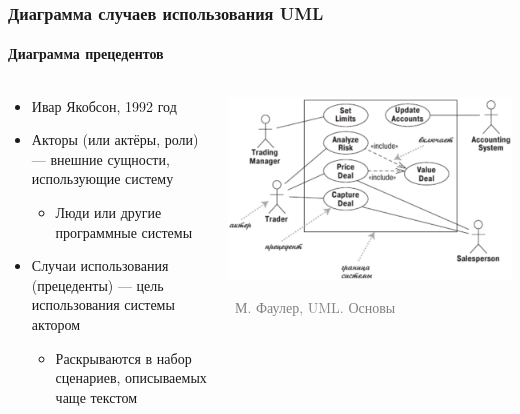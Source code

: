 \documentclass[xetex,mathserif,serif]{beamer}
\newcommand{\attribution}[1] {
    \vspace{-5mm}\begin{flushright}\begin{scriptsize}\textcolor{gray}{\textcopyright\, #1}\end{scriptsize}\end{flushright}
}
\begin{document}
    \begin{frame}
        \frametitle{Диаграмма случаев использования UML}
        \framesubtitle{Диаграмма прецедентов}
        \begin{columns}
            \begin{column}{0.5\textwidth}
                \begin{itemize}
                    \item Ивар Якобсон, 1992 год
                    \item Акторы (или актёры, роли) --- внешние сущности, использующие систему
                    \begin{itemize}
                        \item Люди или другие программные системы
                    \end{itemize}
                    \item Случаи использования (прецеденты)  --- цель использования системы актором
                    \begin{itemize}
                        \item Раскрываются в набор сценариев, описываемых чаще текстом
                    \end{itemize}
                \end{itemize}
            \end{column}
            \begin{column}{0.5\textwidth}
                \begin{center}
                    \includegraphics[width=\textwidth]{useCaseDiagram.png}
                    \attribution{М. Фаулер, UML. Основы}
                \end{center}
            \end{column}
        \end{columns}
    \end{frame}
\end{document}
